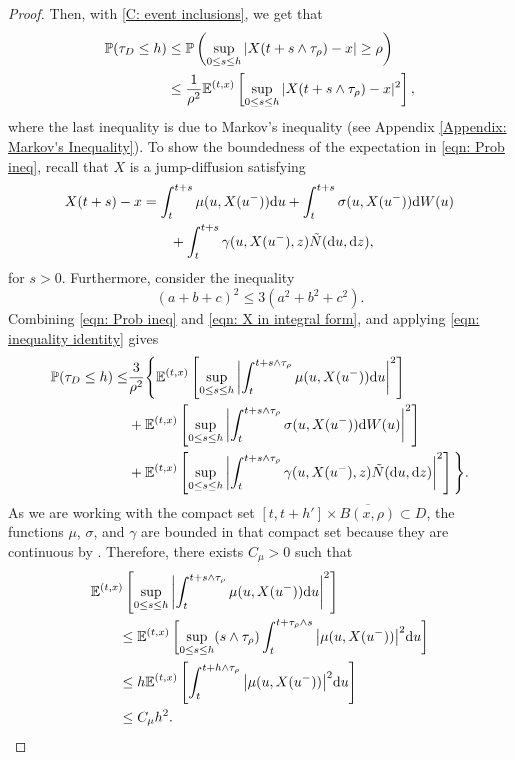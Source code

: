 \begin{proof}
    Then, with \eqref{C: event inclusions}, we get that
    \begin{align}
        \mathbb{P}(\tau_D \leq h) &\leq \mathbb{P} \left(\sup_{0 \leq s \leq h} |X(t+ s \wedge \tau_\rho ) - x| \geq \rho \right) \nonumber \\
        & \leq \frac{1}{\rho^2} \mathbb{E}^{(t,x)} \left[ \sup_{0 \leq s \leq h} |X(t+ s \wedge \tau_\rho ) - x|^2 \right],
        \label{eqn: Prob ineq}
    \end{align}
    where the last inequality is due to Markov's inequality (see Appendix \ref{Appendix: Markov's Inequality}). To show the boundedness of the expectation in \eqref{eqn: Prob ineq}, recall that $X$ is a jump-diffusion satisfying
    \begin{align}
        X(t+s) - x &= \int_t^{t+s} \mu(u,X(u^-)) \mathrm{d} u + \int_t^{t+s} \sigma(u,X(u^-)) \mathrm{d} W(u) \nonumber\\
        & \qquad + \int_t^{t+s} \gamma(u,X(u^-),z) \tilde N(\mathrm{d} u, \mathrm{d} z),
        \label{eqn: X in integral form}
    \end{align}
    for $s>0$. Furthermore, consider the inequality 
    \begin{equation}
        (a+b+c)^2 \leq 3 (a^2+b^2+c^2).
        \label{eqn: inequality identity}
    \end{equation}
    Combining \eqref{eqn: Prob ineq} and \eqref{eqn: X in integral form}, and applying \eqref{eqn: inequality identity} gives
    \begin{align}
        \mathbb{P}(\tau_D \leq h) \leq &\frac{3}{\rho^2} \Bigg\{ \mathbb{E}^{(t,x)} \left[\sup_{0 \leq s \leq h} \left|\int_t^{t+ s \wedge \tau_\rho } \mu(u,X(u^-)) \mathrm{d} u \right|^2 \right] \nonumber \\
        & + \mathbb{E}^{(t,x)} \left[\sup_{0 \leq s \leq h} \left|\int_t^{t+ s \wedge \tau_\rho } \sigma(u,X(u^-)) \mathrm{d} W(u) \right|^2 \right] \nonumber \\
        & + \mathbb{E}^{(t,x)} \left[\sup_{0 \leq s \leq h} \left|\int_t^{t+ s \wedge \tau_\rho } \gamma(u,X(u^-),z) \tilde N(\mathrm{d} u, \mathrm{d} z) \right|^2 \right] \Bigg\}. \label{eqn: Prob ineq 2}
    \end{align}
    As we are working with the compact set $[t,t+h']\times \overline{B(x,\rho)} \subset D$, the functions $\mu$, $\sigma$, and $\gamma$ are bounded in that compact set because they are continuous by . Therefore, there exists $C_\mu > 0$ such that
    \begin{align}
        & \mathbb{E}^{(t,x)} \left[\sup_{0 \leq s \leq h} \left| \int_t^{t+ s \wedge \tau_\rho} \mu(u,X(u^-)) \mathrm{d} u \right|^2 \right] \nonumber \\
        & \qquad \leq \mathbb{E}^{(t,x)} \left[\sup_{0 \leq s \leq h} (s \wedge \tau_\rho) \int_t^{t+\tau_\rho\wedge s} \big|\mu(u,X(u^-)) \big|^2 \mathrm{d} u \right] \nonumber \\
        & \qquad \leq h \mathbb{E}^{(t,x)} \left[\int_t^{t+ h \wedge \tau_\rho} \big|\mu(u,X(u^-)) \big|^2 \mathrm{d} u \right] \nonumber \\
        & \qquad \leq C_\mu h^2.
        \label{eqn: mu-term inequality}
    \end{align}


\end{proof}
